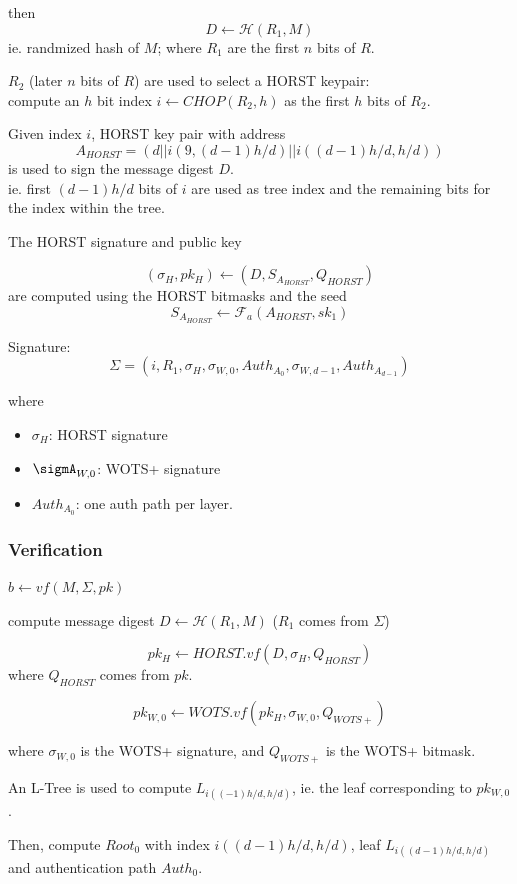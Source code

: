 \documentclass{article}
\theoremstyle{definition}
\begin{document}
then
$$D \leftarrow \mathcal{H}(R_1, M)$$
ie. randmized hash of $M$; where $R_1$ are the first $n$ bits of $R$.

$R_2$ (later $n$ bits of $R$) are used to select a HORST keypair:\\
compute an $h$ bit index $i \leftarrow CHOP(R_2, h)$ as the first $h$ bits of $R_2$.

Given index $i$, HORST key pair with address
$$A_{HORST} = (d || i(9,(d-1) h/d) || i ((d-1)h/d, h/d))$$
is used to sign the message digest $D$.\\
\hspace*{4em}ie. first $(d-1)h/d$ bits of $i$ are used as tree index and the remaining bits for the index within the tree.

The HORST signature and public key

$$(\sigma_H, pk_H) \leftarrow (D, S_{A_{HORST}}, Q_{HORST})$$
are computed using the HORST bitmasks and the seed
$$S_{A_{HORST}} \leftarrow \mathcal{F}_a(A_{HORST}, sk_1)$$

Signature:
$$\Sigma = (i, R_1, \sigma_H, \sigma_{W,0}, Auth_{A_0}, \sigma_{W,d-1}, Auth_{A_{d-1}})$$

where
\begin{itemize}
    \item[ ] $\sigma_H$: HORST signature
    \item[ ] $\sigmA_{W,0}$: WOTS+ signature
    \item[ ] $Auth_{A_0}$: one auth path per layer.
\end{itemize}

\subsubsection{Verification} $b \leftarrow vf(M, \Sigma, pk)$

compute message digest $D \leftarrow \mathcal{H}(R_1, M)$ ($R_1$ comes from $\Sigma$)

$$pk_H \leftarrow HORST.vf(D, \sigma_H, Q_{HORST})$$
where $Q_{HORST}$ comes from $pk$.

$$pk_{W,0} \leftarrow WOTS.vf(pk_H, \sigma_{W,0}, Q_{WOTS+})$$

where $\sigma_{W,0}$ is the WOTS+ signature, and $Q_{WOTS+}$ is the WOTS+ bitmask.

An L-Tree is used to compute $L_{i((-1)h/d, h/d)}$, ie. the leaf corresponding to $pk_{W,0}$.

Then, compute $Root_0$ with index $i((d-1)h/d, h/d)$, leaf $L_{i((d-1)h/d, h/d)}$ and authentication path $Auth_0$.
\end{document}
